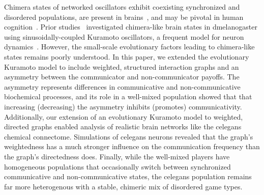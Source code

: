 \documentclass[10pt,letterpaper]{article}
\begin{document}
Chimera states of networked oscillators
exhibit coexisting
synchronized and disordered populations,
are present
in brains~\cite{santos2017chimeralike,bansal2019cognitive},
and may be pivotal in human cognition~\cite{bansal2019cognitive}.
Prior studies~\cite{deng2024chimeralike} investigated
chimera-like brain states in \gls{dmelanogaster}
using sinusoidally-coupled Kuramoto oscillators,
a frequent model for neuron dynamics~\cite{cabral2011role}.
However, the small-scale evolutionary factors
leading to chimera-like states remains poorly understood.
In this paper, we extended the evolutionary Kuramoto model
to include weighted, structured interaction graphs
and an asymmetry between
the communicator and non-communicator payoffs.
The asymmetry represents differences in communicative
and non-communicative biochemical processes,
and its role in a well-mixed population showed that
that increasing (decreasing) the asymmetry
inhibits (promotes) communicativity.
Additionally,
our extension of an evolutionary Kuramoto model
to weighted, directed graphs
enabled analysis of realistic brain networks
like the \gls{celegans} chemical connectome.
Simulations of \gls{celegans} neurons
revealed that the graph's weightedness
has a much stronger influence on the communication frequency
than the graph's directedness does.
Finally, while the well-mixed players have homogeneous populations
that occasionally switch between synchronized communicative
and  non-communicative states,
the \gls{celegans} population remains far more heterogenous
with a stable, chimeric mix of disordered game types.
\end{document}
